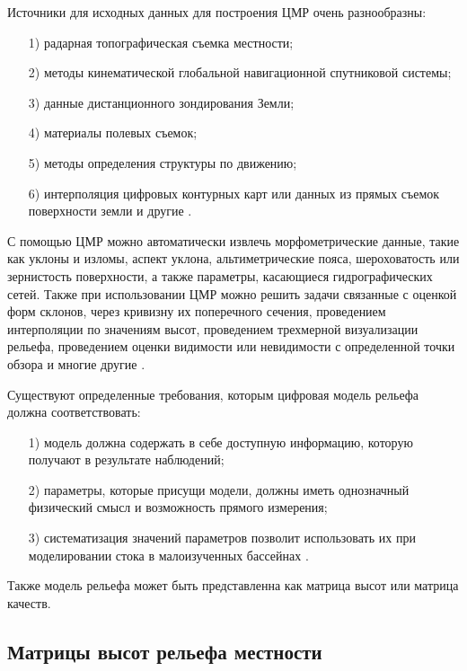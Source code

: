 Источники для исходных данных для построения ЦМР очень разнообразны: 

\begin{enumerate} 
  \item[1)] радарная топографическая съемка местности;
  \item[2)] методы кинематической глобальной навигационной спутниковой системы;
  \item[3)] данные дистанционного зондирования Земли;
  \item[4)] материалы полевых съемок;
  \item[5)] методы определения структуры по движению;
  \item[6)] интерполяция цифровых контурных карт или данных из прямых съемок поверхности земли и другие \cite{2, 17}.
\end{enumerate} 

С помощью ЦМР можно автоматически извлечь морфометрические данные, такие как уклоны и изломы, аспект уклона, альтиметрические пояса, шероховатость или зернистость поверхности, а также параметры, касающиеся гидрографических сетей. Также при использовании ЦМР можно решить задачи связанные с оценкой форм склонов, через кривизну их поперечного сечения, проведением интерполяции по значениям высот, проведением трехмерной визуализации рельефа, проведением оценки видимости или невидимости  с определенной точки обзора и многие другие \cite{15,13}.

Существуют определенные требования, которым цифровая модель рельефа должна соответствовать:

\begin{enumerate} 
  \item[1)] модель должна содержать в себе доступную информацию, которую получают в результате наблюдений;
  \item[2)] параметры, которые присущи модели, должны иметь однозначный физический смысл и возможность прямого измерения;
  \item[3)] систематизация значений параметров позволит использовать их при моделировании стока в малоизученных бассейнах \cite{3,21}.
\end{enumerate} 

Также модель рельефа может быть представленна как матрица высот или матрица качеств.

\subsection{Матрицы высот рельефа местности}

